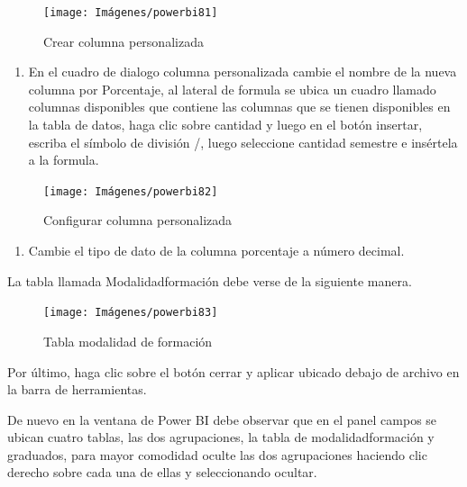 \documentclass[
]{book}
\providecommand{\tightlist}{%
  \setlength{\itemsep}{0pt}\setlength{\parskip}{0pt}}
\begin{document}
\begin{figure}

{\centering \texttt{[image: Imágenes/powerbi81]} 

}

\caption{Crear columna personalizada}\label{fig:paso12porcentajes-fig}
\end{figure}

\begin{enumerate}
\def\labelenumi{\arabic{enumi}.}
\setcounter{enumi}{12}
\tightlist
\item
  En el cuadro de dialogo columna personalizada cambie el nombre de la nueva columna por Porcentaje, al lateral de formula se ubica un cuadro llamado columnas disponibles que contiene las columnas que se tienen disponibles en la tabla de datos, haga clic sobre cantidad y luego en el botón insertar, escriba el símbolo de división /, luego seleccione cantidad semestre e insértela a la formula.
\end{enumerate}

\begin{figure}

{\centering \texttt{[image: Imágenes/powerbi82]} 

}

\caption{Configurar columna personalizada}\label{fig:paso13porcentajes-fig}
\end{figure}

\begin{enumerate}
\def\labelenumi{\arabic{enumi}.}
\setcounter{enumi}{13}
\tightlist
\item
  Cambie el tipo de dato de la columna porcentaje a número decimal.
\end{enumerate}

La tabla llamada Modalidadformación debe verse de la siguiente manera.

\begin{figure}

{\centering \texttt{[image: Imágenes/powerbi83]} 

}

\caption{Tabla modalidad de formación}\label{fig:tablamodalidadformacion-fig}
\end{figure}

Por último, haga clic sobre el botón cerrar y aplicar ubicado debajo de archivo en la barra de herramientas.

De nuevo en la ventana de Power BI debe observar que en el panel campos se ubican cuatro tablas, las dos agrupaciones, la tabla de modalidadformación y graduados, para mayor comodidad oculte las dos agrupaciones haciendo clic derecho sobre cada una de ellas y seleccionando ocultar.
\end{document}
